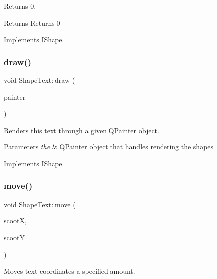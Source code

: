 Returns 0. 

\begin{DoxyReturn}{Returns}
Returns 0 
\end{DoxyReturn}


Implements \mbox{\hyperlink{class_i_shape_aed742a160acdd13c9cfdeb16e605afea}{I\+Shape}}.

\mbox{\label{class_shape_text_a554bed75c86d0ca7d555eefbc7aff7dc}} 
\subsubsection{\texorpdfstring{draw()}{draw()}}
{\footnotesize\ttfamily void Shape\+Text\+::draw (\begin{DoxyParamCaption}\item[{Q\+Painter \&}]{painter }\end{DoxyParamCaption})\hspace{0.3cm}{\ttfamily [virtual]}}



Renders this text through a given Q\+Painter object. 


\begin{DoxyParams}{Parameters}
{\em the} & Q\+Painter object that handles rendering the shapes \\
\hline
\end{DoxyParams}


Implements \mbox{\hyperlink{class_i_shape_ad97c626e7e2c9afb9f51efc41b836e6f}{I\+Shape}}.

\mbox{\label{class_shape_text_ae7b73f317077c9873f4bd59c98b89c60}} 
\subsubsection{\texorpdfstring{move()}{move()}}
{\footnotesize\ttfamily void Shape\+Text\+::move (\begin{DoxyParamCaption}\item[{int}]{scootX,  }\item[{int}]{scootY }\end{DoxyParamCaption})\hspace{0.3cm}{\ttfamily [virtual]}}



Moves text coordinates a specified amount. 


